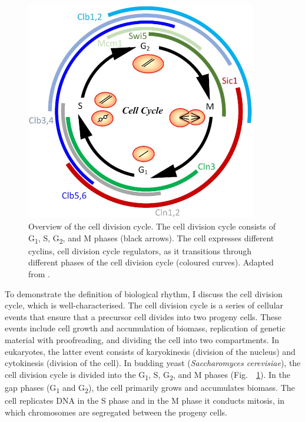 \begin{figure}
  \centering
  \includegraphics[width=0.9\textwidth]{adlerYeastCellCycle2022_1}
  \caption[
    Overview of the cell division cycle
  ]{
    Overview of the cell division cycle.
    The cell division cycle consists of G\textsubscript{1}, S, G\textsubscript{2}, and M phases (black arrows).
    The cell expresses different cyclins, cell division cycle regulators, as it transitions through different phases of the cell division cycle (coloured curves).
    Adapted from \textcite{adlerYeastCellCycle2022}.}
  \label{fig:intro-cdc-overview}
\end{figure}

To demonstrate the definition of biological rhythm, I discuss the cell division cycle, which is well-char\-ac\-terised.
The cell division cycle is a series of cellular events that ensure that a precursor cell divides into two progeny cells.
These events include cell growth and accumulation of biomass, replication of genetic material with proofreading, and dividing the cell into two compartments.
In eukaryotes, the latter event consists of karyokinesis (division of the nucleus) and cytokinesis (division of the cell).
In budding yeast (\textit{Saccharomyces cerevisiae}), the cell division cycle is divided into the G\textsubscript{1}, S, G\textsubscript{2}, and M phases (Fig.\ ~\ref{fig:intro-cdc-overview}).
In the gap phases (G\textsubscript{1} and G\textsubscript{2}), the cell primarily grows and accumulates biomass.
The cell replicates DNA in the S phase and in the M phase it conducts mitosis, in which chromosomes are segregated between the progeny cells.

